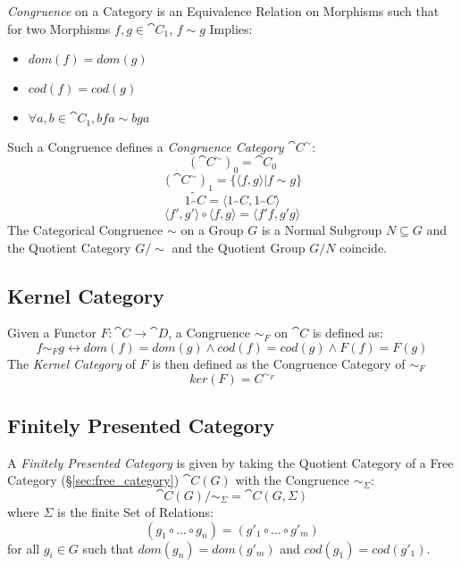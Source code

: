 \emph{Congruence} on a Category is an Equivalence Relation on
Morphisms such that for two Morphisms $f,g \in \cat{C_1}$, $f \sim
g$ Implies:
\begin{itemize}
  \item $dom(f) = dom(g)$
  \item $cod(f) = cod(g)$
  \item $\forall a,b \in \cat{C_1}, bfa \sim bga$
\end{itemize}
Such a Congruence defines a \emph{Congruence Category}
$\cat{C^{\sim}}$:
\[
  (\cat{C^{\sim}})_0 = \cat{C}_0
\]\[
  (\cat{C^{\sim}})_1 = \{\langle f,g \rangle | f \sim g\}
\]\[
  \tilde{1_\cat{C}} = \langle 1_\cat{C}, 1_\cat{C} \rangle
\]\[
  \langle f',g' \rangle \circ \langle f,g \rangle = \langle f'f,g'g \rangle
\]
The Categorical Congruence $\sim$ on a Group $G$ is a Normal Subgroup
$N \subseteq G$ and the Quotient Category $G/\sim$ and the Quotient
Group $G/N$ coincide. \cite{awodey06}



\subsection{Kernel Category}\label{sec:kernel_category}

Given a Functor $F : \cat{C} \rightarrow \cat{D}$, a Congruence
$\sim_F$ on $\cat{C}$ is defined as:
\[
  f \sim_F g \leftrightarrow dom(f) = dom(g) \wedge cod(f) = cod(g)
  \wedge F(f) = F(g)
\]
The \emph{Kernel Category} of $F$ is then defined as the Congruence
Category of $\sim_F$
\[
  ker(F) = C^{\sim_F}
\]



\subsection{Finitely Presented Category}
\label{sec:finitely_presented}

A \emph{Finitely Presented Category} is given by taking the Quotient
Category of a Free Category (\S\ref{sec:free_category})
$\cat{C}(G)$ with the Congruence $\sim_\Sigma$:
\[
  \cat{C}(G) / \sim_{\Sigma} = \cat{C}(G,\Sigma)
\]
where $\Sigma$ is the finite Set of Relations:
\[
  (g_1 \circ \ldots \circ g_n) = (g'_1 \circ \ldots \circ g'_m)
\]
for all $g_i \in G$ such that $dom(g_n) = dom(g'_m)$ and $cod(g_1) =
cod(g'_1)$.

